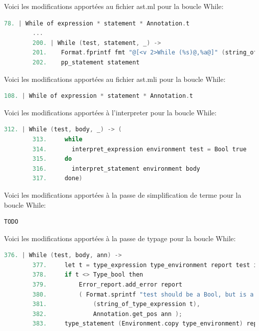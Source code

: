 \documentclass{report}
\begin{document}
    Voici les modifications apportées au fichier ast.ml pour la boucle While: \\

    \begin{lstlisting}[language=C, basicstyle=\ttfamily]
        78. | While of expression * statement * Annotation.t
        ...
        200. | While (test, statement, _) ->
        201.    Format.fprintf fmt "@[<v 2>While (%s)@,%a@]" (string_of_expression test)
        202.    pp_statement statement
    \end{lstlisting}

    Voici les modifications apportées au fichier ast.mli pour la boucle While: \\

    \begin{lstlisting}[language=C, basicstyle=\ttfamily]
        108. | While of expression * statement * Annotation.t
    \end{lstlisting}
    
    Voici les modifications apportées à l'interpreter pour la boucle While: \\

    \begin{lstlisting}[language=C, basicstyle=\ttfamily]
        312. | While (test, body, _) -> (
        313.     while
        314.       interpret_expression environment test = Bool true
        315.     do
        316.       interpret_statement environment body
        317.     done)
    \end{lstlisting}

    Voici les modifications apportées à la passe de simplification de terme pour la boucle While: \\

    \begin{lstlisting}[language=C, basicstyle=\ttfamily]
        TODO
    \end{lstlisting}

    Voici les modifications apportées à la passe de typage pour la boucle While: \\

    \begin{lstlisting}[language=C, basicstyle=\ttfamily]
        376. | While (test, body, ann) ->
        377.     let t = type_expression type_environment report test in
        378.     if t <> Type_bool then
        379.         Error_report.add_error report
        380.         ( Format.sprintf "test should be a Bool, but is a %s"
        381.             (string_of_type_expression t),
        382.             Annotation.get_pos ann );
        383.     type_statement (Environment.copy type_environment) report body
    \end{lstlisting}
\end{document}
